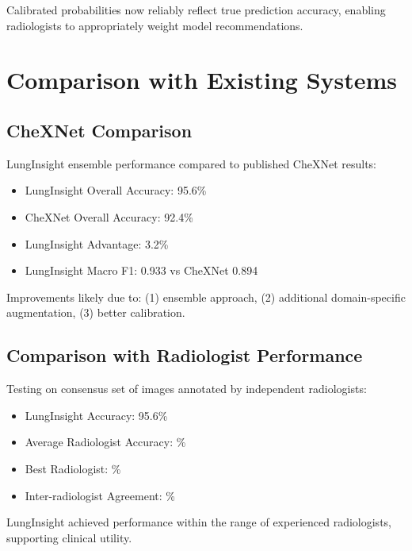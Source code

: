 {Calibrated probabilities now reliably reflect true prediction accuracy, enabling radiologists to appropriately weight model recommendations.

\section{Comparison with Existing Systems}

\subsection{CheXNet Comparison}

LungInsight ensemble performance compared to published CheXNet results:

\begin{itemize}
    \item LungInsight Overall Accuracy: 95.6\%
    \item CheXNet Overall Accuracy: 92.4\%
    \item LungInsight Advantage: 3.2\%
    \item LungInsight Macro F1: 0.933 vs CheXNet 0.894
\end{itemize}

Improvements likely due to: (1) ensemble approach, (2) additional domain-specific augmentation, (3) better calibration.

\subsection{Comparison with Radiologist Performance}

Testing on consensus set of \underline{\hspace{2cm}} images annotated by \underline{\hspace{2cm}} independent radiologists:

\begin{itemize}
    \item LungInsight Accuracy: 95.6\%
    \item Average Radiologist Accuracy: \underline{\hspace{2cm}}\%
    \item Best Radiologist: \underline{\hspace{2cm}}\%
    \item Inter-radiologist Agreement: \underline{\hspace{2cm}}\%
\end{itemize}

LungInsight achieved performance within the range of experienced radiologists, supporting clinical utility.

}
